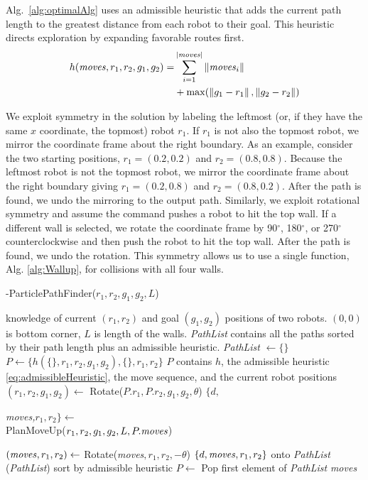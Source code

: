 Alg.~\ref{alg:optimalAlg} uses an admissible heuristic that adds the current path length to the greatest distance from each robot to their goal. This heuristic directs exploration by expanding favorable routes first.
\begin{align}\label{eq:admissibleHeuristic}
h(\text{\emph{moves}}, r_1,r_2,g_1,g_2) =& \sum_{i=1}^{|\text{\emph{moves}}|} \left\lVert\text{\emph{moves}}_i\right\rVert  \\
&+  \max( \left\lVert g_1-r_1\right\rVert, \left\lVert g_2-r_2\right\rVert ) \nonumber
\end{align}


We  exploit symmetry in the solution by labeling the leftmost (or, if they have the same $x$ coordinate, the topmost) robot $r_1$. 
 If $r_1$ is not also the topmost robot, we mirror the coordinate frame about the right boundary. 
 As an example, consider the two starting positions, $r_1 =  (0.2, 0.2) $ and $r_2 = (0.8, 0.8)$. 
  Because the leftmost robot is not the topmost robot, we mirror the coordinate frame about the right boundary giving $r_1 = (0.2, 0.8)$ and $r_2 = (0.8,0.2)$. 
 After the path is found, we undo the mirroring to the output path. 
  Similarly, we exploit rotational symmetry and assume the command pushes a robot to hit the top wall.
   If a different wall is selected, we rotate the coordinate frame by 90$^{\circ}$, 180$^{\circ}$, or 270$^{\circ}$ counterclockwise and then push the robot to hit the top wall.  After the path is found, we undo the rotation. 
   This symmetry allows us to use a single function, Alg. \ref{alg:Wallup},  for collisions with all four walls. 

\begin{algorithm}[htb]
\caption{ { -ParticlePathFinder}($r_1,r_2,g_1,g_2,L$)}\label{alg:optimalAlg}
\begin{algorithmic}[1]
\Require knowledge of current $(r_1,r_2)$ and goal $(g_1,g_2)$ positions of  two robots. 
$(0,0)$ is bottom corner,
 $L$ is length of the walls. 
 \emph{PathList} contains all the paths sorted by their path length plus an admissible heuristic. 
 \State  \emph{PathList} $\gets \{\}$
 \State $P \gets   \{ h(\{\},r_1,r_2,g_1,g_2  ) ,\{\},r_1,r_2\} $ \Comment $P$ contains $h$, the admissible heuristic \eqref{eq:admissibleHeuristic}, the move sequence, and the current robot positions
\State $(r_1,r_2,g_1,g_2) \gets$ {\sc Rotate}($P.r_1,P.r_2,g_1,g_2,\theta$)
\State $\{d, $ \parbox[t]{.3\linewidth}{%
 \emph{moves,}$ r_1,r_2\} \gets$\\
 {\sc  PlanMoveUp}($r_1,r_2,g_1,g_2,L, P.\text{\emph{moves}}$)}
\State $(\text{\emph{moves}}, r_1,r_2) \gets$ {\sc Rotate}(\emph{moves}$, r_1,r_2,-\theta$)
 $\{d, \text{\emph{moves}}, r_1,r_2\} $ onto \emph{PathList}
\EndFor
{}(\emph{PathList}) \Comment sort by admissible heuristic
\State $P \gets $ {\sc Pop} first element of \emph{PathList}
\EndWhile
\State \Return \emph{moves}
\end{algorithmic}
\end{algorithm}


